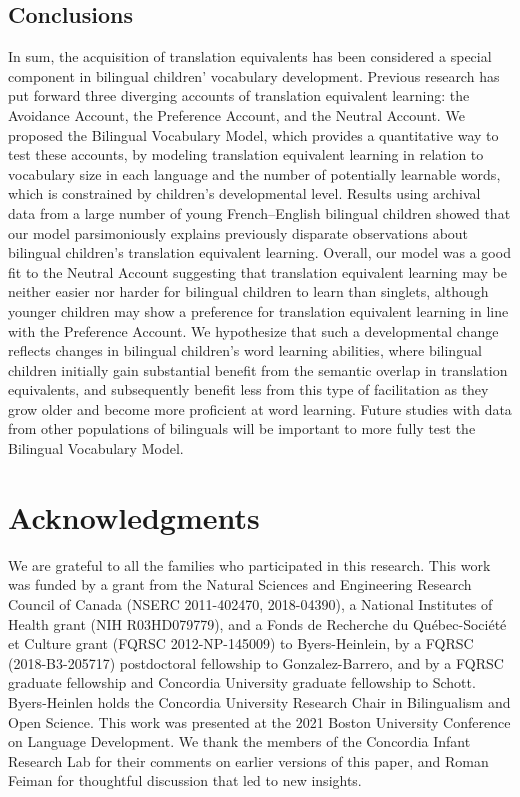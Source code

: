 \documentclass[
  english,
  ,man,floatsintext]{apa6}
\begin{document}
\hypertarget{conclusions}{%
\subsection{Conclusions}\label{conclusions}}

In sum, the acquisition of translation equivalents has been considered a special component in bilingual children' vocabulary development. Previous research has put forward three diverging accounts of translation equivalent learning: the Avoidance Account, the Preference Account, and the Neutral Account. We proposed the Bilingual Vocabulary Model, which provides a quantitative way to test these accounts, by modeling translation equivalent learning in relation to vocabulary size in each language and the number of potentially learnable words, which is constrained by children's developmental level. Results using archival data from a large number of young French--English bilingual children showed that our model parsimoniously explains previously disparate observations about bilingual children's translation equivalent learning. Overall, our model was a good fit to the Neutral Account suggesting that translation equivalent learning may be neither easier nor harder for bilingual children to learn than singlets, although younger children may show a preference for translation equivalent learning in line with the Preference Account. We hypothesize that such a developmental change reflects changes in bilingual children's word learning abilities, where bilingual children initially gain substantial benefit from the semantic overlap in translation equivalents, and subsequently benefit less from this type of facilitation as they grow older and become more proficient at word learning. Future studies with data from other populations of bilinguals will be important to more fully test the Bilingual Vocabulary Model.

\newpage

\hypertarget{acknowledgments}{%
\section{Acknowledgments}\label{acknowledgments}}

\noindent We are grateful to all the families who participated in this research. This work was funded by a grant from the Natural Sciences and Engineering Research Council of Canada (NSERC 2011-402470, 2018-04390), a National Institutes of Health grant (NIH R03HD079779), and a Fonds de Recherche du Québec-Société et Culture grant (FQRSC 2012-NP-145009) to Byers-Heinlein, by a FQRSC (2018-B3-205717) postdoctoral fellowship to Gonzalez-Barrero, and by a FQRSC graduate fellowship and Concordia University graduate fellowship to Schott. Byers-Heinlen holds the Concordia University Research Chair in Bilingualism and Open Science. This work was presented at the 2021 Boston University Conference on Language Development. We thank the members of the Concordia Infant Research Lab for their comments on earlier versions of this paper, and Roman Feiman for thoughtful discussion that led to new insights.
\end{document}

